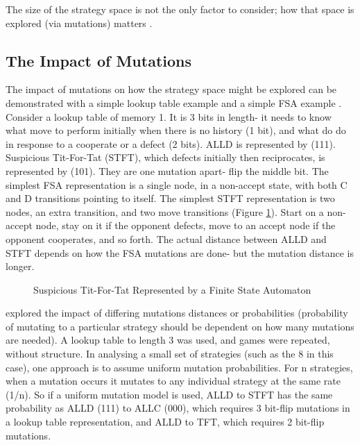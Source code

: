 \documentclass[a4paper,11pt]{article}
\begin{document}
The size of the strategy space is not the only factor to consider; how that space is explored (via mutations) matters \citep{garcia:PLoSOne:2012}.

\subsection{The Impact of Mutations}
The impact of mutations on how the strategy space might be explored can be demonstrated with a simple lookup table example and a simple FSA example \citep{fogel1993evolving, garcia:PLoSOne:2012}.  
Consider a lookup table of memory 1. It is 3 bits in length- it needs to know what move to perform initially when there is no history (1 bit), and what do do in response to a cooperate or a defect (2 bits). 
ALLD is represented by (111). Suspicious Tit-For-Tat (STFT), which defects initially then reciprocates, is represented by (101). They are one mutation apart- flip the middle bit. 
The simplest FSA representation is a single node, in a non-accept state, with both C and D transitions pointing to itself. The simplest STFT representation is two nodes, an extra transition, and two move transitions (Figure \ref{fig:stft}). Start on a non-accept node, stay on it if the opponent defects, move to an accept node if the opponent cooperates, and so forth. 
The actual distance between ALLD and STFT depends on how the FSA mutations are done- but the mutation distance is longer. 

\begin{figure}[h]
\center
\captionsetup{justification=centering}
\center
\caption{Suspicious Tit-For-Tat Represented by a Finite State Automaton}
\label{fig:stft}
\end{figure}

\citet{garcia:PLoSOne:2012} explored the impact of differing mutations distances or probabilities (probability of mutating to a particular strategy should be dependent on how many mutations are needed). 
A lookup table to length 3 was used, and games were repeated, without structure. 
In analysing a small set of strategies (such as the 8 in this case), one approach is to assume uniform mutation probabilities. For n strategies, when a mutation occurs it mutates to any individual strategy at the same rate (1/n). So if a uniform mutation model is used, ALLD to STFT has the same probability as ALLD (111) to ALLC (000), which requires 3 bit-flip mutations in a lookup table representation, and ALLD to TFT, which requires 2 bit-flip mutations.
\end{document}
